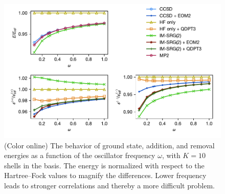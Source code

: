 \begin{figure}
  \centering
  \includegraphics{fig-by-freq-10-6-normal.pdf}
  \caption{(Color online) The behavior of ground state, addition, and removal energies as a function of the oscillator frequency $\omega$, with $K = 10$ shells in the basis.  The energy is normalized with respect to the Hartree--Fock values to magnify the differences.  Lower frequency leads to stronger correlations and thereby a more difficult problem.}
  \label{fig:by-freq-10-6-normal}
\end{figure}

